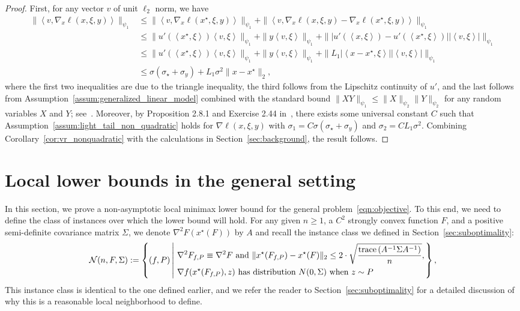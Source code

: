 \documentclass[11pt,twoside]{article}
\numberwithin{equation}{section}
\newcommand{\trace}[1]{\mathrm{trace}\left(#1\right)}
\newcommand{\cN}{\mathcal{N}}
\newcommand{\abs}[1]{\left| #1 \right|}
\newcommand{\1}{\mathbf{1}}
\newcommand{\dotp}[1]{\left\langle #1\right\rangle}
\theoremstyle{remark}
\theoremstyle{plain}
\newcommand{\nclass}{\cN}
\begin{document}
\begin{proof} 
	First, for any vector $v$ of unit $\ell_2$ norm, we have 
	\begin{align*}
		\|\dotp{v, \nabla_x \ell(x, \xi, y)}\|_{\psi_1} &\le \|\dotp{v, \nabla_x \ell(x^\star, \xi, y)}\|_{\psi_1} +\|\dotp{v, \nabla_x \ell(x, \xi, y) - \nabla_x \ell(x^\star, \xi, y)}\|_{\psi_1}\\
		&\le  \|  u'(\dotp{x^\star,\xi}) \dotp{v,\xi}  \|_{\psi_1} + \| y \dotp{v, \xi} \|_{\psi_1} + \| |u'(\dotp{x,\xi})- u'(\dotp{x^\star,\xi})| \abs{\dotp{v, \xi}}\|_{\psi_1}\\
		&\le  \|  u'(\dotp{x^\star,\xi}) \dotp{v,\xi}  \|_{\psi_1} + \| y \dotp{v, \xi} \|_{\psi_1} + \| L_1\abs{\dotp{x-x^\star,\xi}} \abs{\dotp{v, \xi}}\|_{\psi_1}\\
		&\le \sigma (\sigma_\star + \sigma_y)  + L_1 \sigma^2 \|x-x^\star\|_2,
	\end{align*}
	where the first two inequalities are due to the triangle inequality, the third follows from the Lipschitz continuity of $u'$, and the last follows from Assumption~\ref{assum:generalized_linear_model} combined with the standard bound $\|XY\|_{\psi_1} \le \|X\|_{\psi_2}\|Y\|_{\psi_2}$ for any random variables $X$ and $Y$; see~\cite[Lemma 2.8.6]{vershynin2018high}. Moreover, by Proposition 2.8.1 and Exercise 2.44 in~\cite{vershynin2018high}, there exists some universal constant $C$ such that Assumption~\ref{assum:light_tail_non_quadratic} holds for $\nabla \ell(x, \xi,y)$ with $\sigma_1 = C\sigma (\sigma_\star + \sigma_y)$ and $\sigma_2 =  CL_1 \sigma^2 $. Combining Corollary~\ref{cor:vr_nonquadratic} with the calculations in Section~\ref{sec:background}, the result follows.
\end{proof}



\section{Local lower bounds in the general setting}\label{sec:lower_bound}
In this section, we prove a non-asymptotic local minimax lower bound for the general problem~\eqref{eqn:objective}. To this end, we need to define the class of instances over which the lower bound will hold. For any given $n \ge 1$, a $C^2$ strongly convex function $F$, and a positive semi-definite covariance matrix $\Sigma$, we denote $\nabla^2 F(x^\star(F))$ by $A$ and recall the instance class we defined in Section~\ref{sec:suboptimality}:
\begin{align*}
\nclass (n, F, \Sigma) :=  \left\{ (f,P) \left| 
\begin{aligned}
	&\text{ $\nabla^2 F_{f,P} \equiv \nabla^2 F$ and $ \|x^\star(F_{f,P}) - x^\star(F)\|_2 \le 2\cdot \sqrt{\frac{\trace{A^{-1} \Sigma A^{-1}}}{n}}$,} \\
	& \text{ $\nabla f(x^\star(F_{f,P}), z)$ has distribution  $N(0, \Sigma)$ when $z\sim P$}
\end{aligned}
\right.\right\},
\end{align*}
This instance class is identical to the one defined earlier, and we refer the reader to Section~\ref{sec:suboptimality} for a detailed discussion of why this is a reasonable local neighborhood to define. 
\end{document}
